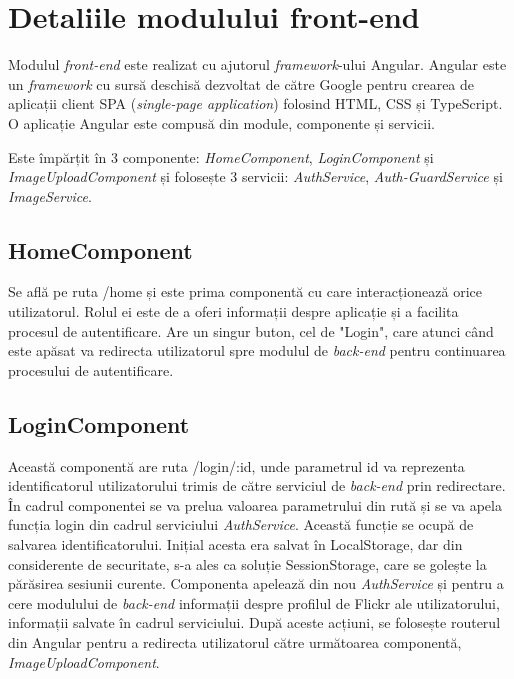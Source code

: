 \section{Detaliile modulului front-end}
Modulul \textit{front-end} este realizat cu ajutorul \textit{framework}-ului Angular. Angular este un \textit{framework} cu sursă deschisă dezvoltat de către Google pentru crearea de aplicații client  SPA (\textit{single-page application}) folosind HTML, CSS și TypeScript. O aplicație Angular este compusă din module, componente și servicii.


Este împărțit în 3 componente: \textit{HomeComponent}, \textit{LoginComponent} și \textit{ImageUploadComponent} și folosește 3 servicii: \textit{AuthService}, \textit{Auth-GuardService} și \textit{ImageService}.

\subsection{HomeComponent}
 Se află pe ruta /home și este prima componentă cu care interacționează orice utilizatorul. Rolul ei este de a oferi informații despre aplicație și a facilita procesul de autentificare. Are un singur buton, cel de "Login", care atunci când este apăsat va redirecta utilizatorul spre modulul de \textit{back-end} pentru continuarea procesului de autentificare.
 
 \subsection{LoginComponent}
 Această componentă are ruta /login/:id, unde parametrul id va reprezenta identificatorul utilizatorului trimis de către serviciul de \textit{back-end} prin redirectare. În cadrul componentei se va prelua valoarea parametrului din rută și se va apela funcția login din cadrul serviciului \textit{AuthService}. Această funcție se ocupă de salvarea identificatorului. Inițial acesta era salvat în LocalStorage, dar din considerente de securitate, s-a ales ca soluție SessionStorage, care se golește la părăsirea sesiunii curente. Componenta apelează din nou \textit{AuthService} și pentru a cere modulului de \textit{back-end} informații despre profilul de Flickr ale utilizatorului, informații salvate în cadrul serviciului. După aceste acțiuni, se folosește routerul din Angular pentru a redirecta utilizatorul către următoarea componentă, \textit{ImageUploadComponent}.
 
